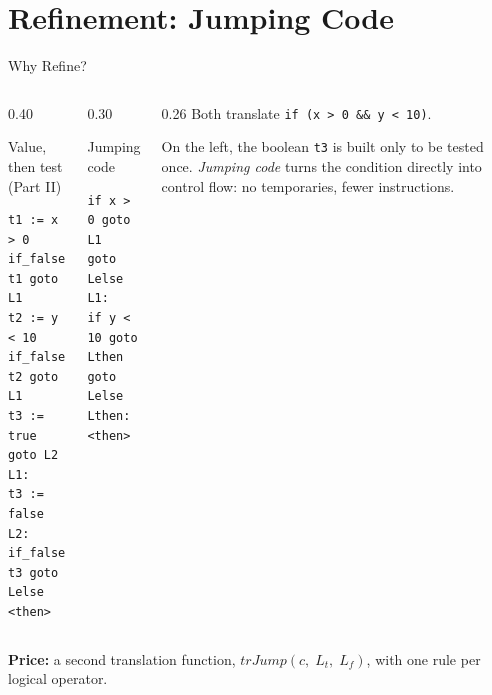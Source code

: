 \documentclass[aspectratio=169,11pt,xcolor=table]{beamer}
\newcommand{\trJump}[3]{\mathit{trJump}(#1,\;#2,\;#3)}
\newcommand{\tc}[1]{\texttt{#1}}
\begin{document}
\section{Refinement: Jumping Code}

\begin{frame}[fragile]{Why Refine?}
  \begin{columns}[T]
    \begin{column}{0.40\textwidth}
      \begin{block}{Value, then test (Part II)}
        \begin{verbatim}
t1 := x > 0
if_false t1 goto L1
t2 := y < 10
if_false t2 goto L1
t3 := true
goto L2
L1:
t3 := false
L2:
if_false t3 goto Lelse
<then>
        \end{verbatim}
      \end{block}
    \end{column}
    \begin{column}{0.30\textwidth}
      \begin{block}{Jumping code}
        \begin{verbatim}
if x > 0 goto L1
goto Lelse
L1:
if y < 10 goto Lthen
goto Lelse
Lthen:
<then>
        \end{verbatim}
      \end{block}
    \end{column}
    \begin{column}{0.26\textwidth}
      \small
      Both translate \tc{if (x > 0 \&\& y < 10)}.

      \medskip
      On the left, the boolean \tc{t3} is built only to be tested once.
      \emph{Jumping code} turns the condition directly into control flow:
      no temporaries, fewer instructions.
    \end{column}
  \end{columns}

  \medskip
  \small
  \textbf{Price:} a second translation function,
  $\trJump{c}{L_t}{L_f}$, with one rule per logical operator.
\end{frame}
\end{document}
